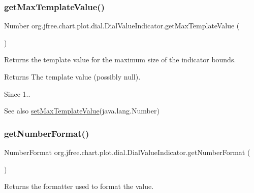 \subsubsection{\texorpdfstring{get\+Max\+Template\+Value()}{getMaxTemplateValue()}}
{\footnotesize\ttfamily Number org.\+jfree.\+chart.\+plot.\+dial.\+Dial\+Value\+Indicator.\+get\+Max\+Template\+Value (\begin{DoxyParamCaption}{ }\end{DoxyParamCaption})}

Returns the template value for the maximum size of the indicator bounds.

\begin{DoxyReturn}{Returns}
The template value (possibly {\ttfamily null}).
\end{DoxyReturn}
\begin{DoxySince}{Since}
1..
\end{DoxySince}
\begin{DoxySeeAlso}{See also}
\mbox{\hyperlink{classorg_1_1jfree_1_1chart_1_1plot_1_1dial_1_1_dial_value_indicator_a8d237840259511c2cff7e6872cf34dfe}{set\+Max\+Template\+Value}}(java.\+lang.\+Number) 
\end{DoxySeeAlso}
\mbox{\label{classorg_1_1jfree_1_1chart_1_1plot_1_1dial_1_1_dial_value_indicator_a3c320a660cacb2e7ed3abca17f2ff0f0}} 
\subsubsection{\texorpdfstring{get\+Number\+Format()}{getNumberFormat()}}
{\footnotesize\ttfamily Number\+Format org.\+jfree.\+chart.\+plot.\+dial.\+Dial\+Value\+Indicator.\+get\+Number\+Format (\begin{DoxyParamCaption}{ }\end{DoxyParamCaption})}

Returns the formatter used to format the value.

